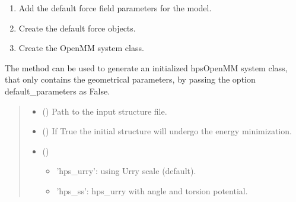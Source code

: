 \documentclass[letterpaper,10pt,english]{sphinxmanual}
\begin{document}
\begin{fulllineitems}
\begin{fulllineitems}
\begin{enumerate}
\item {} 
\sphinxAtStartPar
Add the default force field parameters for the model.

\item {} 
\sphinxAtStartPar
Create the default force objects.

\item {} 
\sphinxAtStartPar
Create the OpenMM system class.

\end{enumerate}

\sphinxAtStartPar
The method can be used to generate an initialized hpsOpenMM system class, that only
contains the geometrical parameters, by passing the option default\_parameters as False.
\begin{quote}\begin{description}
\begin{itemize}
\item {} 
\sphinxAtStartPar
{} (\sphinxstyleliteralemphasis{\sphinxupquote{ {[}}}\sphinxstyleliteralemphasis{\sphinxupquote{{]}}}) \textendash{} Path to the input structure file.

\item {} 
\sphinxAtStartPar
{} (\sphinxstyleliteralemphasis{\sphinxupquote{ (}}\sphinxstyleliteralemphasis{\sphinxupquote{)}}) \textendash{} If True the initial structure will undergo the energy minimization.

\item {} 
\sphinxAtStartPar
{} (\sphinxstyleliteralemphasis{\sphinxupquote{ {[}}}\sphinxstyleliteralemphasis{\sphinxupquote{, }}\sphinxstyleliteralemphasis{\sphinxupquote{{]}}}) \textendash{} \begin{description}
\begin{itemize}
\item {} 
\sphinxAtStartPar
’hps\_urry’: using Urry scale (default).

\item {} 
\sphinxAtStartPar
’hps\_ss’: hps\_urry with angle and torsion potential.


\end{itemize}
\end{description}
\end{itemize}
\end{description}
\end{quote}
\end{fulllineitems}
\end{fulllineitems}
\end{document}
